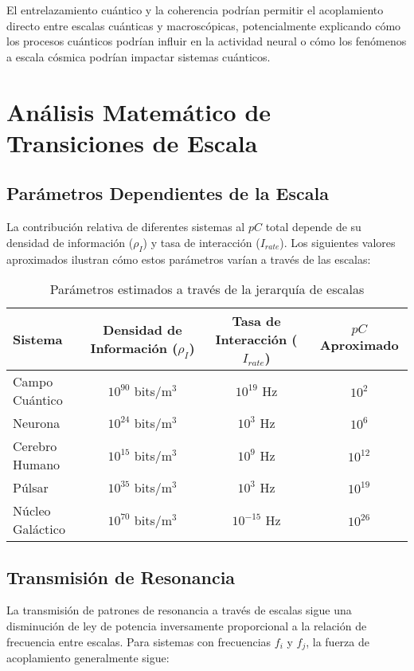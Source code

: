 \documentclass[12pt]{article}
\begin{document}
El entrelazamiento cuántico y la coherencia podrían permitir el acoplamiento directo entre escalas cuánticas y macroscópicas, potencialmente explicando cómo los procesos cuánticos podrían influir en la actividad neural o cómo los fenómenos a escala cósmica podrían impactar sistemas cuánticos.

\section{Análisis Matemático de Transiciones de Escala}

\subsection{Parámetros Dependientes de la Escala}

La contribución relativa de diferentes sistemas al $pC$ total depende de su densidad de información ($\rho_I$) y tasa de interacción ($I_{rate}$). Los siguientes valores aproximados ilustran cómo estos parámetros varían a través de las escalas:

\begin{table}[h]
\centering
\begin{tabular}{|l|c|c|c|}
\hline
\textbf{Sistema} & \textbf{Densidad de Información ($\rho_I$)} & \textbf{Tasa de Interacción ($I_{rate}$)} & \textbf{$pC$ Aproximado} \\
\hline
Campo Cuántico & $10^{90}$ bits/m$^3$ & $10^{19}$ Hz & $10^{2}$ \\
\hline
Neurona & $10^{24}$ bits/m$^3$ & $10^{3}$ Hz & $10^{6}$ \\
\hline
Cerebro Humano & $10^{15}$ bits/m$^3$ & $10^{9}$ Hz & $10^{12}$ \\
\hline
Púlsar & $10^{35}$ bits/m$^3$ & $10^{3}$ Hz & $10^{19}$ \\
\hline
Núcleo Galáctico & $10^{70}$ bits/m$^3$ & $10^{-15}$ Hz & $10^{26}$ \\
\hline
\end{tabular}
\caption{Parámetros estimados a través de la jerarquía de escalas}
\end{table}

\subsection{Transmisión de Resonancia}

La transmisión de patrones de resonancia a través de escalas sigue una disminución de ley de potencia inversamente proporcional a la relación de frecuencia entre escalas. Para sistemas con frecuencias $f_i$ y $f_j$, la fuerza de acoplamiento generalmente sigue:
\end{document}
